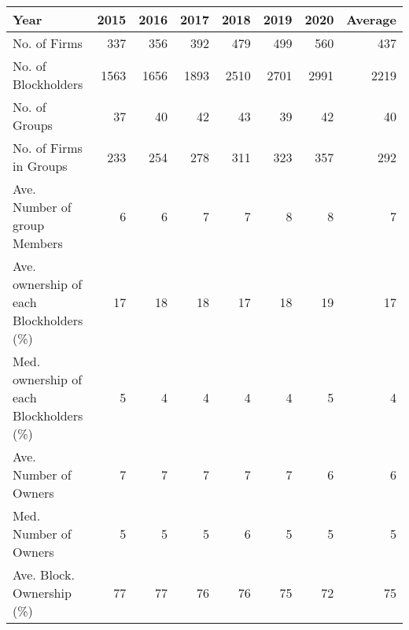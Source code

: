 \begin{tabular}{lrrrrrrr}
\toprule
Year &  2015 &  2016 &  2017 &  2018 &  2019 &  2020 &  Average \\
\midrule
No. of Firms                            &   337 &   356 &   392 &   479 &   499 &   560 &      437 \\
No. of Blockholders                     &  1563 &  1656 &  1893 &  2510 &  2701 &  2991 &     2219 \\
No. of Groups                           &    37 &    40 &    42 &    43 &    39 &    42 &       40 \\
No. of Firms in Groups                  &   233 &   254 &   278 &   311 &   323 &   357 &      292 \\
Ave. Number of group Members            &     6 &     6 &     7 &     7 &     8 &     8 &        7 \\
Ave. ownership of each Blockholders (\%) &    17 &    18 &    18 &    17 &    18 &    19 &       17 \\
Med. ownership of each Blockholders (\%) &     5 &     4 &     4 &     4 &     4 &     5 &        4 \\
Ave. Number of Owners                   &     7 &     7 &     7 &     7 &     7 &     6 &        6 \\
Med. Number of Owners                   &     5 &     5 &     5 &     6 &     5 &     5 &        5 \\
Ave. Block. Ownership (\%)               &    77 &    77 &    76 &    76 &    75 &    72 &       75 \\
\bottomrule
\end{tabular}
